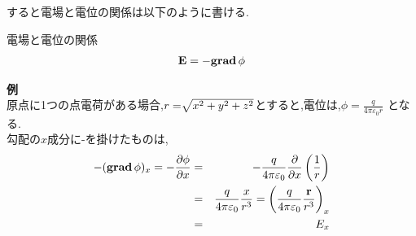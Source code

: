 \documentclass[../main]{subfiles}
\begin{document}
すると電場と電位の関係は以下のように書ける.
\begin{itembox}[c]{電場と電位の関係}
\begin{eqnarray}
{\bf E} = - {\rm{\bf grad}}\, \phi
\end{eqnarray}
\end{itembox}
{\bf 例} \\
原点に1つの点電荷がある場合,$r=\sqrt[]{\mathstrut x^2+y^2+z^2}$とすると,電位は,$\phi=\frac{q}{4 \pi \varepsilon_0 r}$ となる.\\
勾配の$x$成分に-を掛けたものは, \\
\begin{eqnarray}
-({\rm {\bf grad}}\, \phi)_x = - \frac{\partial \phi}{\partial x} &=& -\frac{q}{4 \pi \varepsilon_0} \frac{\partial}{\partial x} \left( \frac{1}{r} \right) \\
&=& \frac{q}{4 \pi \varepsilon_0} \frac{x}{r^3} = \left( \frac{q}{4 \pi \varepsilon_0} \frac{{\bf r}}{r^3} \right)_x \\
&=&E_x
\end{eqnarray}
\end{document}
